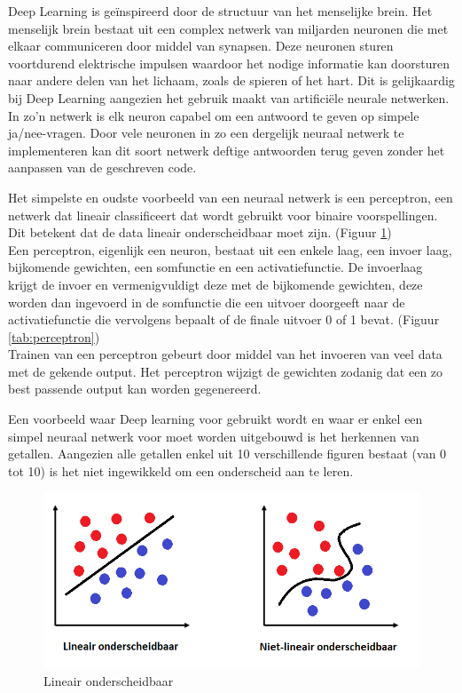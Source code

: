 Deep Learning is geïnspireerd door de structuur van het menselijke brein. Het menselijk brein bestaat uit een complex netwerk van miljarden neuronen die met elkaar communiceren door middel van synapsen.
Deze neuronen sturen voortdurend elektrische impulsen waardoor het nodige informatie kan doorsturen naar andere delen van het lichaam, zoals de spieren of het hart.
Dit is gelijkaardig bij Deep Learning aangezien het gebruik maakt van artificiële neurale netwerken. In zo'n netwerk is elk neuron capabel om een antwoord te geven op simpele ja/nee-vragen. Door vele neuronen in zo een dergelijk neuraal netwerk te implementeren kan dit soort netwerk deftige antwoorden terug geven zonder het aanpassen van de geschreven code.

Het simpelste en oudste voorbeeld van een neuraal netwerk is een perceptron, een netwerk dat lineair classificeert dat wordt gebruikt voor binaire voorspellingen. Dit betekent dat de data lineair onderscheidbaar moet zijn. (Figuur \ref{tab:lineair})\\
Een perceptron, eigenlijk een neuron, bestaat uit een enkele laag, een invoer laag, bijkomende gewichten, een somfunctie en een activatiefunctie.
De invoerlaag krijgt de invoer en vermenigvuldigt deze met de bijkomende gewichten, deze worden dan ingevoerd in de somfunctie die een uitvoer doorgeeft naar de activatiefunctie die vervolgens bepaalt of de finale uitvoer 0 of 1 bevat. (Figuur \ref{tab:perceptron})\\
Trainen van een perceptron gebeurt door middel van het invoeren van veel data met de gekende output. Het perceptron wijzigt de gewichten zodanig dat een zo best passende output kan worden gegenereerd.

Een voorbeeld waar Deep learning voor gebruikt wordt en waar er enkel een simpel neuraal netwerk voor moet worden uitgebouwd is het herkennen van getallen.
Aangezien alle getallen enkel uit 10 verschillende figuren bestaat (van 0 tot 10) is het niet ingewikkeld om een onderscheid aan te leren. \autocite{Dann2010}


\begin{figure}
	
	
	\includegraphics[width=\linewidth]{img/Lineair_onderscheidbaar.png}
	\caption{Lineair onderscheidbaar}
    \label{tab:lineair}
	
\end{figure}



